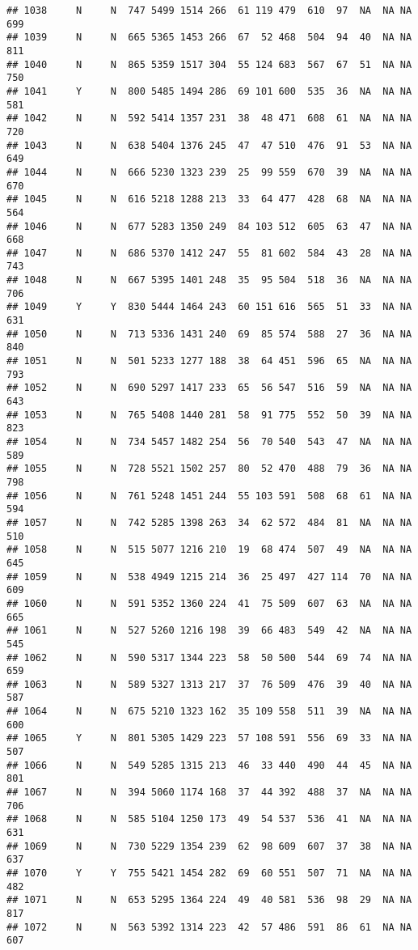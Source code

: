 \documentclass[]{article}
\begin{document}
\begin{verbatim}
## 1038     N     N  747 5499 1514 266  61 119 479  610  97  NA  NA NA  699
## 1039     N     N  665 5365 1453 266  67  52 468  504  94  40  NA NA  811
## 1040     N     N  865 5359 1517 304  55 124 683  567  67  51  NA NA  750
## 1041     Y     N  800 5485 1494 286  69 101 600  535  36  NA  NA NA  581
## 1042     N     N  592 5414 1357 231  38  48 471  608  61  NA  NA NA  720
## 1043     N     N  638 5404 1376 245  47  47 510  476  91  53  NA NA  649
## 1044     N     N  666 5230 1323 239  25  99 559  670  39  NA  NA NA  670
## 1045     N     N  616 5218 1288 213  33  64 477  428  68  NA  NA NA  564
## 1046     N     N  677 5283 1350 249  84 103 512  605  63  47  NA NA  668
## 1047     N     N  686 5370 1412 247  55  81 602  584  43  28  NA NA  743
## 1048     N     N  667 5395 1401 248  35  95 504  518  36  NA  NA NA  706
## 1049     Y     Y  830 5444 1464 243  60 151 616  565  51  33  NA NA  631
## 1050     N     N  713 5336 1431 240  69  85 574  588  27  36  NA NA  840
## 1051     N     N  501 5233 1277 188  38  64 451  596  65  NA  NA NA  793
## 1052     N     N  690 5297 1417 233  65  56 547  516  59  NA  NA NA  643
## 1053     N     N  765 5408 1440 281  58  91 775  552  50  39  NA NA  823
## 1054     N     N  734 5457 1482 254  56  70 540  543  47  NA  NA NA  589
## 1055     N     N  728 5521 1502 257  80  52 470  488  79  36  NA NA  798
## 1056     N     N  761 5248 1451 244  55 103 591  508  68  61  NA NA  594
## 1057     N     N  742 5285 1398 263  34  62 572  484  81  NA  NA NA  510
## 1058     N     N  515 5077 1216 210  19  68 474  507  49  NA  NA NA  645
## 1059     N     N  538 4949 1215 214  36  25 497  427 114  70  NA NA  609
## 1060     N     N  591 5352 1360 224  41  75 509  607  63  NA  NA NA  665
## 1061     N     N  527 5260 1216 198  39  66 483  549  42  NA  NA NA  545
## 1062     N     N  590 5317 1344 223  58  50 500  544  69  74  NA NA  659
## 1063     N     N  589 5327 1313 217  37  76 509  476  39  40  NA NA  587
## 1064     N     N  675 5210 1323 162  35 109 558  511  39  NA  NA NA  600
## 1065     Y     N  801 5305 1429 223  57 108 591  556  69  33  NA NA  507
## 1066     N     N  549 5285 1315 213  46  33 440  490  44  45  NA NA  801
## 1067     N     N  394 5060 1174 168  37  44 392  488  37  NA  NA NA  706
## 1068     N     N  585 5104 1250 173  49  54 537  536  41  NA  NA NA  631
## 1069     N     N  730 5229 1354 239  62  98 609  607  37  38  NA NA  637
## 1070     Y     Y  755 5421 1454 282  69  60 551  507  71  NA  NA NA  482
## 1071     N     N  653 5295 1364 224  49  40 581  536  98  29  NA NA  817
## 1072     N     N  563 5392 1314 223  42  57 486  591  86  61  NA NA  607

\end{verbatim}
\end{document}
